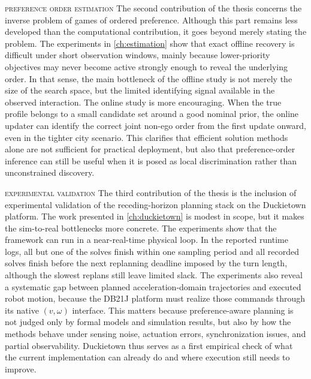 \smallskip \noindent
\textsc{preference order estimation} \quad
The second contribution of the thesis concerns the inverse problem of
games of ordered preference. Although this part remains less developed
than the computational contribution, it goes beyond merely stating the
problem. The experiments in \cref{ch:estimation} show that
exact offline recovery is difficult under short observation windows,
mainly because lower-priority objectives may never become active strongly
enough to reveal the underlying order. In that sense, the main bottleneck
of the offline study is not merely the size of the search space, but the
limited identifying signal available in the observed interaction. The
online study is more encouraging. When the true profile belongs to a
small candidate set around a good nominal prior, the
online updater can identify the correct joint non-ego order from the
first update onward, even in the tighter city scenario. This clarifies
that efficient solution methods alone are not sufficient for practical
deployment, but also that preference-order inference can still be useful
when it is posed as local discrimination rather than unconstrained
discovery.

\smallskip \noindent
\textsc{experimental validation} \quad
The third contribution of the thesis is the inclusion of experimental
validation of the receding-horizon planning stack on the Duckietown
platform. The work presented in
\cref{ch:duckietown} is modest in scope, but it makes the sim-to-real
bottlenecks more concrete.
The experiments show that the framework can run in a near-real-time
physical loop. In the reported runtime logs, all but one of the solves
finish within one sampling period and all recorded solves finish before the
next replanning deadline imposed by the turn length, although the
slowest replans still leave limited slack.
The experiments also reveal a systematic gap between planned acceleration-domain
trajectories and executed robot motion, because the DB21J platform must
realize those commands through its native \((v,\omega)\) interface.
This matters because preference-aware planning is not judged only by
formal models and simulation results, but also by how the methods behave
under sensing noise, actuation errors, synchronization issues, and
partial observability.
Duckietown thus serves as a first empirical check of what the current
implementation can already do and where execution still needs to improve.

